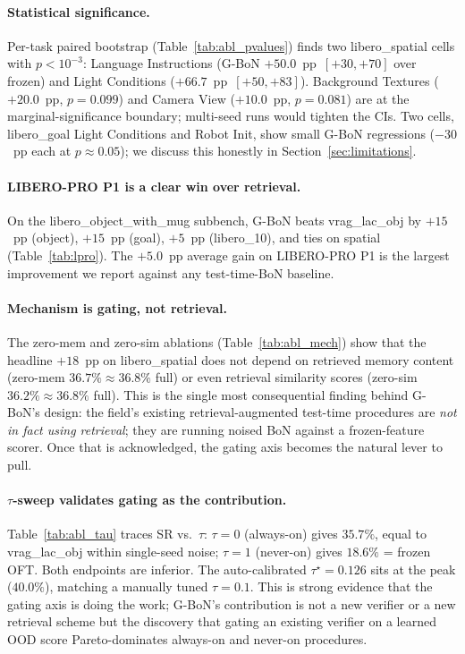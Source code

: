 \documentclass{article}
\begin{document}
\paragraph{Statistical significance.}
Per-task paired bootstrap (Table~\ref{tab:abl_pvalues}) finds two
libero\_spatial cells with $p<10^{-3}$: Language Instructions
(G-BoN $+50.0$~pp~$[+30, +70]$ over frozen) and Light Conditions
($+66.7$~pp~$[+50, +83]$). Background Textures ($+20.0$~pp,
$p\!=\!0.099$) and Camera View ($+10.0$~pp, $p\!=\!0.081$) are at
the marginal-significance boundary; multi-seed runs would tighten the
CIs. Two cells, libero\_goal Light Conditions and Robot Init,
show small G-BoN regressions ($-30$~pp each at $p\!\approx\!0.05$);
we discuss this honestly in Section~\ref{sec:limitations}.

\paragraph{LIBERO-PRO P1 is a clear win over retrieval.}
On the libero\_object\_with\_mug subbench, G-BoN beats vrag\_lac\_obj
by $+15$~pp (object), $+15$~pp (goal), $+5$~pp (libero\_10), and ties
on spatial (Table~\ref{tab:lpro}). The $+5.0$~pp average gain on
LIBERO-PRO P1 is the largest improvement we report against any
test-time-BoN baseline.

\paragraph{Mechanism is gating, not retrieval.}
The zero-mem and zero-sim ablations
(Table~\ref{tab:abl_mech}) show that the headline $+18$~pp on
libero\_spatial does not depend on retrieved memory content
(zero-mem $36.7\% \approx 36.8\%$ full) or even retrieval similarity
scores (zero-sim $36.2\% \approx 36.8\%$ full). This is the
single most consequential finding behind G-BoN's design: the
field's existing retrieval-augmented test-time procedures are
\emph{not in fact using retrieval}; they are running noised BoN
against a frozen-feature scorer. Once that is acknowledged, the
gating axis becomes the natural lever to pull.

\paragraph{$\tau$-sweep validates gating as the contribution.}
Table~\ref{tab:abl_tau} traces SR vs.\ $\tau$: $\tau{=}0$ (always-on)
gives $35.7\%$, equal to vrag\_lac\_obj within single-seed noise;
$\tau{=}1$ (never-on) gives $18.6\%$ = frozen OFT. Both endpoints
are inferior. The auto-calibrated $\tau^\star{=}0.126$ sits at the
peak ($40.0\%$), matching a manually tuned $\tau{=}0.1$. This is
strong evidence that the gating axis is doing the work; G-BoN's
contribution is not a new verifier or a new retrieval scheme but
the discovery that gating an existing verifier on a learned OOD
score Pareto-dominates always-on and never-on procedures.
\end{document}
